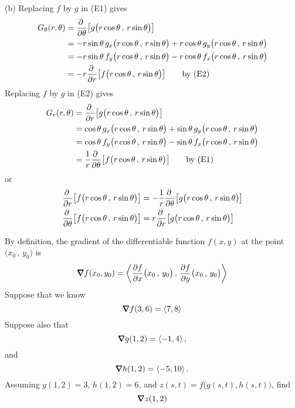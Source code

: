 \begin{solution}
(b) Replacing $f$ by $g$ in (E1) gives
\begin{align*}
G_\theta(r,\theta)
&=\pdiff{}{\theta}\big[g\big(r\cos\theta\,,\,r\sin\theta\big)\big] \\
&=-r\sin\theta\, g_x\big(r\cos\theta\,,\,r\sin\theta\big)
  +r\cos\theta\, g_y\big(r\cos\theta\,,\,r\sin\theta\big) \\
&=-r\sin\theta\, f_y\big(r\cos\theta\,,\,r\sin\theta\big)
  -r\cos\theta\, f_x\big(r\cos\theta\,,\,r\sin\theta\big) \\
&=-r \pdiff{}{r}\big[f\big(r\cos\theta\,,\,r\sin\theta\big)\big] 
\qquad\text{by (E2)}
\end{align*}
Replacing $f$ by $g$ in (E2) gives
\begin{align*}
G_r(r,\theta)
&=\pdiff{}{r}\big[g\big(r\cos\theta\,,\,r\sin\theta\big)\big] \\
&= \cos\theta\, g_x\big(r\cos\theta\,,\,r\sin\theta\big)
  +\sin\theta\, g_y\big(r\cos\theta\,,\,r\sin\theta\big) \\
&= \cos\theta\, f_y\big(r\cos\theta\,,\,r\sin\theta\big)
  -\sin\theta\, f_x\big(r\cos\theta\,,\,r\sin\theta\big) \\
&=\frac{1}{r} \pdiff{}{\theta}\big[f\big(r\cos\theta\,,\,r\sin\theta\big)\big]
\qquad\text{by (E1)}
\end{align*}
or
\begin{align*}
\pdiff{}{r}\big[f\big(r\cos\theta\,,\,r\sin\theta\big)\big]
&=-\frac{1}{r} \pdiff{}{\theta}\big[g\big(r\cos\theta\,,\,r\sin\theta\big)\big]
\\
\pdiff{}{\theta}\big[f\big(r\cos\theta\,,\,r\sin\theta\big)\big]
&=r\pdiff{}{r}\big[g\big(r\cos\theta\,,\,r\sin\theta\big)\big]
\end{align*}
\end{solution}

\begin{question}[M200 2003A] %
By definition, the gradient of the differentiable function $f(x,y)$ at the point 
$\big( x_0\,,\,y_0\big)$ is
\begin{equation*}
\vnabla f(x_0,y_0)
=\llt \pdiff{f}{x}\big( x_0\,,\,y_0\big)\,,\,
     \pdiff{f}{y}\big( x_0\,,\,y_0\big)\rgt
\end{equation*}
Suppose that we know
\begin{equation*}
\vnabla f(3,6)=\llt 7,8\rgt
\end{equation*}
Suppose also that
\begin{equation*}
\vnabla g(1,2)=\llt -1,4\rgt,
\end{equation*}
and
\begin{equation*}
\vnabla h(1,2)=\llt -5,10\rgt.
\end{equation*}
Assuming $g(1,2)=3$, $h(1,2)=6$, and $z(s,t)=f\big(g(s,t),h(s,t)\big)$,
find
\begin{equation*}
\vnabla z(1,2)
\end{equation*}
\end{question}

